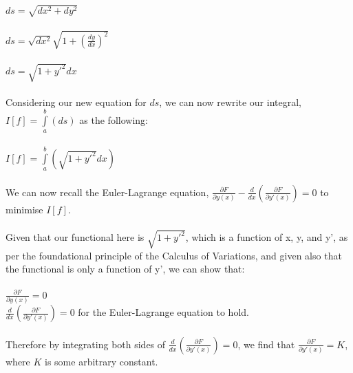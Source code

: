 \documentclass[12pt]{report}
\begin{document}
\usetikzlibrary{decorations.pathreplacing}

\\
\\
\(ds = \sqrt{dx^2+dy^2}\)
\\
\\
\(ds = \sqrt{dx^2}\sqrt{1+(\frac{dy}{dx})^2}\)
\\
\\
\(ds = \sqrt{1+y'^2}dx\)
\\
\\
Considering our new equation for \(ds\), we can now rewrite our integral, \(I[f] = \int\limits_a^b (ds)\) as the following:
\\
\\
\(I[f] = \int\limits_a^b (\sqrt{1+y'^2}dx)\)
\\
\\
We can now recall the Euler-Lagrange equation, \(\frac{\partial F}{\partial y(x)} - \frac{d}{dx}(\frac{\partial F}{\partial y'(x)}) = 0\) to minimise \(I[f]\).
\\
\\
Given that our functional here is \(\sqrt{1+y'^2}\), which is a function of x, y, and y', as per the foundational principle of the Calculus of Variations, and given also that the functional is only a function of y', we can show that:
\\
\\
\(\frac{\partial F}{\partial y(x)} = 0\)
\\
\implies \(\frac{d}{dx}(\frac{\partial F}{\partial y'(x)}) = 0\) for the Euler-Lagrange equation to hold.
\\
\\
Therefore by integrating both sides of \(\frac{d}{dx}(\frac{\partial F}{\partial y'(x)}) = 0\), we find that \(\frac{\partial F}{\partial y'(x)} = K\), where \(K\) is some arbitrary constant.
\end{document}
